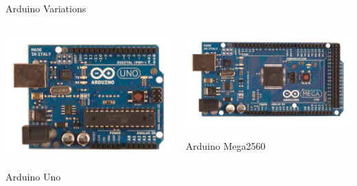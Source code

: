 \documentclass{beamer}
\begin{document}
\begin{frame}{Arduino Variations}
  \begin{columns}
    \begin{column}{0.5\textwidth}
      \pause
      \centerline{\includegraphics[width=.95\textwidth]{ArduinoUnoFront.jpg}}
      \centerline{Arduino Uno}
    \end{column}
    \begin{column}{0.5\textwidth}
      \pause
      \centerline{\includegraphics[width=.95\textwidth]{ArduinoMega2650Front.jpg}}
      \centerline{Arduino Mega2560}
    \end{column}
  \end{columns}
\end{frame}
\end{document}
